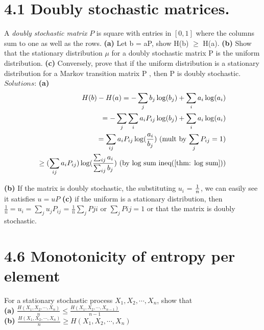 \documentclass[10pt]{article}
\newcommand{\pref}[1]{{(\ref{#1})}}
\begin{document}
\begin{tiny}
\begin{multicols}{3}
\section*{4.1 Doubly stochastic matrices.} %
A \emph{doubly stochastic matrix} $P$ is square with entries in $[0,1]$ where the columns sum to one as well as the rows. 
\textbf{(a)}  Let b = aP, show H(b) $\ge$ H(a). 
\textbf{(b)} Show that the stationary distribution $\mu$ for a doubly stochastic matrix P is the uniform distribution. 
\textbf{(c)} Conversely, prove that if the uniform distribution is a stationary distribution for a Markov transition matrix P , then P is doubly stochastic.
$Solutions$:
\textbf{(a)}
\begin{eqnarray*}
H(b) - H(a) 
= -\sum_j b_j \log (b_j) + \sum_i a_i \log (a_i) \\
= - \sum_j \sum_i a_iP_{ij} \log(b_j)+\sum_i a_i \log (a_i) \\
= \sum_{ij}a_iP_{ij} \log(\frac{ a_i }{ b_j }) 
\text{ (mult by $\sum_j P_{ij} = 1$)} \\
\ge (\sum_{ij}a_iP_{ij}) \log(\frac{\sum_{ij} a_i }{\sum_{ij} b_j })
\text{ (by log sum ineq\pref{thm: log sum})} \\
\end{eqnarray*}

\textbf{(b)} If the matrix is doubly stochastic, the substituting $u_i$ = $1\over{n}$, we can easily see it satisfies $u=uP$
\textbf{(c)} if the uniform is a stationary distribution, then
$\frac{1}{n} = u_i = \sum_{j}u_{j}P_{ij}$ = $ \frac{1}{n}\sum_jP{ji}$ or $\sum_jP{ij}=1$ or that the matrix is doubly stochastic.


\section*{4.6 Monotonicity of entropy per element}
For a stationary stochastic process $X_1, X_2, \cdots , X_n$, show that
\\ \textbf{(a)} $\frac{H(X_1,X_2,\cdots,X_n)}{n} \le \frac{H(X_1,X_2,\cdots,X_{n - 1})}{ n - 1} $
\\ \textbf{(b)} $\frac{H(X_1,X_2,\cdots,X_n)}{n} \ge H(X_1,X_2,\cdots,X_n)$


\end{multicols}
\end{tiny}
\end{document}
